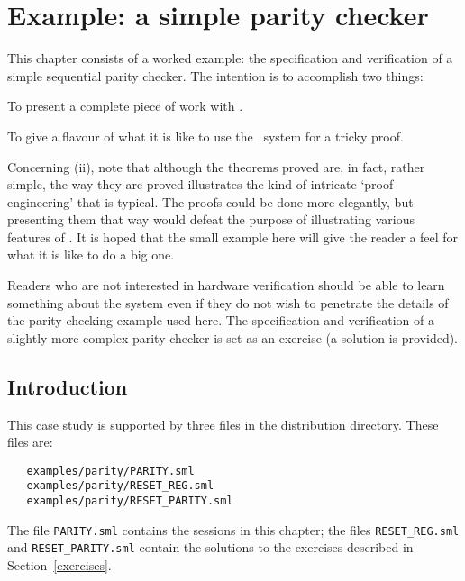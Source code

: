 
\chapter{Example: a simple parity checker}\label{parity}

This chapter consists of a worked example: the specification and
verification of a simple sequential parity checker.  The intention is
to accomplish two things:

\begin{myenumerate}
\item To present a complete piece of work with \HOL.
\item To give a flavour of what it is like to use the \HOL\ system for
  a tricky proof.
\end{myenumerate}

Concerning (ii), note that although the theorems proved are, in fact,
rather simple, the way they are proved illustrates the kind of
intricate `proof engineering' that is typical.  The proofs could be
done more elegantly, but presenting them that way would defeat the
purpose of illustrating various features of \HOL. It is hoped that the
small example here will give the reader a feel for what it is like to
do a big one.

Readers who are not interested in hardware verification should be able
to learn something about the \HOL{} system even if they do not wish to
penetrate the details of the parity-checking example used here.  The
specification and verification of a slightly more complex parity
checker is set as an exercise (a solution is provided).

\section{Introduction}

This case study is supported by three files in the \HOL{} distribution
directory. These files are:

\begin{hol}
\begin{verbatim}
   examples/parity/PARITY.sml
   examples/parity/RESET_REG.sml
   examples/parity/RESET_PARITY.sml
\end{verbatim}
\end{hol}

The file {\verb|PARITY.sml|} contains the \HOL{} sessions in this
chapter; the files {\verb|RESET_REG.sml|} and
{\verb|RESET_PARITY.sml|} contain the solutions to the exercises
described in Section~\ref{exercises}.

